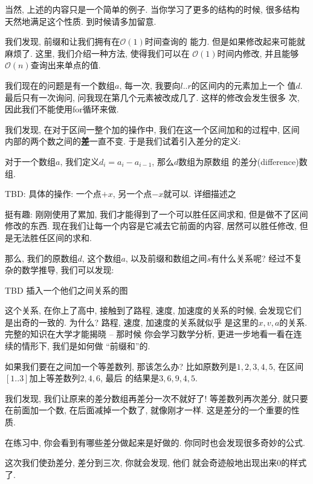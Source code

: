 当然, 上述的内容只是一个简单的例子. 当你学习了更多的结构的时候, 很多结构
天然地满足这个性质. 到时候请多加留意. 

 我们发现, 前缀和让我们拥有在$\mathcal O(1)$时间查询的
能力. 但是如果修改起来可能就麻烦了. 这里, 我们介绍一种方法, 使得我们可以在
$\mathcal O(1)$时间内修改, 并且能够$\mathcal O(n)$查询出来单点的值. 

我们现在的问题是有一个数组$a$, 每一次, 我要向$l..r$的区间内的元素加上一个
值$d$. 最后只有一次询问, 问我现在第几个元素被改成几了. 这样的修改会发生很多
次, 因此我们不能使用for循环来做. 

我们发现, 在对于区间一整个加的操作中, 我们在这一个区间加和的过程中, 区间
内部的两个数之间的\textbf{差}一直不变. 于是我们试着引入差分的定义: 

\begin{definition}
    对于一个数组$a$, 我们定义$d_i=a_i-a_{i-1}$, 那么$d$数组为原数组
    的差分(difference)数组. 
\end{definition}

TBD: 具体的操作: 一个点$+x$, 另一个点$-x$就可以. 详细描述之

挺有趣: 刚刚使用了累加, 我们才能得到了一个可以胜任区间求和, 但是做不了区间
修改的东西. 现在我们让每一个内容是它减去它前面的内容, 居然可以胜任修改, 
但是无法胜任区间的求和. 

那么, 我们的原数组$d$, 这个数组$a$, 以及前缀和数组之间$s$有什么关系呢? 
经过不复杂的数学推导, 我们可以发现: 

TBD 插入一个他们之间关系的图

\begin{remark}
    这个关系, 在你上了高中, 接触到了路程, 速度, 加速度的关系的时候, 
    会发现它们是出奇的一致的. 为什么? 路程, 速度, 加速度的关系就似乎
    是这里的$x, v,a$的关系. 完整的知识在大学才能揭晓 -- 那时候
    你会学习数学分析, 更进一步地看一看在连续的情形下, 我们是如何做
    ``前缀和''的. 
\end{remark}

 如果我们要在之间加一个等差数列, 那该怎么办?
比如原数列是$1,2,3,4,5$, 在区间$[1..3]$加上等差数列$2, 4, 6$, 最后
的结果是$3, 6, 9, 4, 5$. 

我们发现, 我们让原来的差分数组再差分一次不就好了! 等差数列再次差分, 就只要
在前面加一个数, 在后面减掉一个数了, 就像刚才一样. 这是差分的一个重要的性质.

在练习中, 你会看到有哪些差分做起来是好做的. 你同时也会发现很多奇妙的公式. 

 这次我们使劲差分, 差分到三次, 你就会发现, 他们
就会奇迹般地出现出来0的样式了. 


